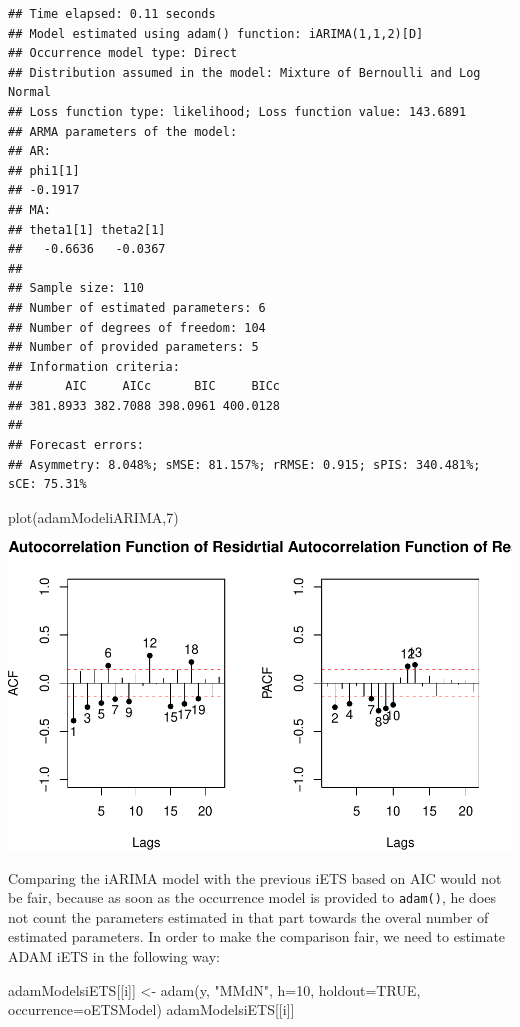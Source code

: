 \documentclass[
]{book}
\newenvironment{Shaded}{\begin{snugshade}}{\end{snugshade}}
\newcommand{\AttributeTok}[1]{\textcolor[rgb]{0.77,0.63,0.00}{#1}}
\newcommand{\ConstantTok}[1]{\textcolor[rgb]{0.00,0.00,0.00}{#1}}
\newcommand{\DecValTok}[1]{\textcolor[rgb]{0.00,0.00,0.81}{#1}}
\newcommand{\FunctionTok}[1]{\textcolor[rgb]{0.00,0.00,0.00}{#1}}
\newcommand{\NormalTok}[1]{#1}
\newcommand{\OtherTok}[1]{\textcolor[rgb]{0.56,0.35,0.01}{#1}}
\newcommand{\StringTok}[1]{\textcolor[rgb]{0.31,0.60,0.02}{#1}}
\theoremstyle{definition}
\theoremstyle{definition}
\theoremstyle{definition}
\theoremstyle{definition}
\theoremstyle{remark}
\begin{document}
\begin{verbatim}
## Time elapsed: 0.11 seconds
## Model estimated using adam() function: iARIMA(1,1,2)[D]
## Occurrence model type: Direct
## Distribution assumed in the model: Mixture of Bernoulli and Log Normal
## Loss function type: likelihood; Loss function value: 143.6891
## ARMA parameters of the model:
## AR:
## phi1[1] 
## -0.1917 
## MA:
## theta1[1] theta2[1] 
##   -0.6636   -0.0367 
## 
## Sample size: 110
## Number of estimated parameters: 6
## Number of degrees of freedom: 104
## Number of provided parameters: 5
## Information criteria:
##      AIC     AICc      BIC     BICc 
## 381.8933 382.7088 398.0961 400.0128 
## 
## Forecast errors:
## Asymmetry: 8.048%; sMSE: 81.157%; rRMSE: 0.915; sPIS: 340.481%; sCE: 75.31%
\end{verbatim}

\begin{Shaded}
\begin{Highlighting}[]
\FunctionTok{plot}\NormalTok{(adamModeliARIMA,}\DecValTok{7}\NormalTok{)}
\end{Highlighting}
\end{Shaded}

\includegraphics{adam_files/figure-latex/unnamed-chunk-119-1.pdf}

Comparing the iARIMA model with the previous iETS based on AIC would not be fair, because as soon as the occurrence model is provided to \texttt{adam()}, he does not count the parameters estimated in that part towards the overal number of estimated parameters. In order to make the comparison fair, we need to estimate ADAM iETS in the following way:

\begin{Shaded}
\begin{Highlighting}[]
\NormalTok{adamModelsiETS[[i]] }\OtherTok{\textless{}{-}} \FunctionTok{adam}\NormalTok{(y, }\StringTok{"MMdN"}\NormalTok{, }\AttributeTok{h=}\DecValTok{10}\NormalTok{, }\AttributeTok{holdout=}\ConstantTok{TRUE}\NormalTok{,}
                            \AttributeTok{occurrence=}\NormalTok{oETSModel)}
\NormalTok{adamModelsiETS[[i]]}
\end{Highlighting}
\end{Shaded}
\end{document}
